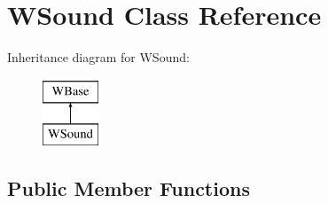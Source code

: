 \hypertarget{class_w_sound}{}\section{W\+Sound Class Reference}
\label{class_w_sound}
Inheritance diagram for W\+Sound\+:\begin{figure}[H]
\begin{center}
\leavevmode
\includegraphics[height=2.000000cm]{class_w_sound}
\end{center}
\end{figure}
\subsection*{Public Member Functions}
